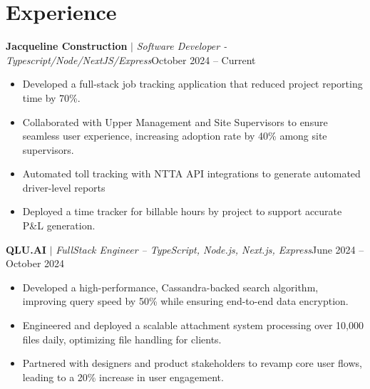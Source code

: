 
\section{Experience}
  \resumeSubHeadingListStart

          \resumeProjectHeading
          {\textbf{Jacqueline Construction}\vspace{8pt} $|$ \footnotesize\emph{Software Developer - Typescript/Node/NextJS/Express}}{October 2024 -- Current}
            \begin{itemize}
              \item 
              Developed a full-stack job tracking application that reduced project reporting time by 70\%. 
              \item 
              Collaborated with Upper Management and Site Supervisors to ensure seamless user experience, increasing adoption rate by 40\% among site supervisors.
              \item 
              Automated toll tracking with NTTA API integrations to generate  automated driver-level reports 
              \item
              Deployed a time tracker for billable hours by project to support accurate P\&L generation.         
              \end{itemize}
              \resumeProjectHeading
              {\textbf{QLU.AI}\vspace{8pt} $|$ \footnotesize\emph{FullStack Engineer – TypeScript, Node.js, Next.js, Express}}{June 2024 -- October 2024}
              \begin{itemize}
                \item Developed a high-performance, Cassandra-backed search algorithm, improving query speed by 50\% while ensuring end-to-end data encryption.
                \item Engineered and deployed a scalable attachment system processing over 10,000 files daily, optimizing file handling for clients.
                \item Partnered with designers and product stakeholders to revamp core user flows, leading to a 20\% increase in user engagement.
              \end{itemize}
